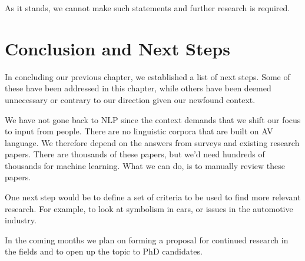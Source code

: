 \documentclass[12pt, usenames, dvipsnames]{report}
\begin{document}
\begin{flushleft}
As it stands, we cannot make such statements and further research is required.


\section{Conclusion and Next Steps}

In concluding our previous chapter, we established a list of next steps. 
Some of these have been addressed in this chapter, while others have been deemed unnecessary or contrary to our direction given our newfound context.

We have not gone back to NLP since the context demands that we shift our focus to input from people.
There are no linguistic corpora that are built on AV language. 
We therefore depend on the answers from surveys and existing research papers. 
There are thousands of these papers, but we'd need hundreds of thousands for machine learning.
What we can do, is to manually review these papers.

One next step would be to define a set of criteria to be used to find more relevant research. 
For example, to look at symbolism in cars, or issues in the automotive industry.

In the coming months we plan on forming a proposal for continued research in the fields and to open up the topic to PhD candidates.





\end{flushleft}
\end{document}
